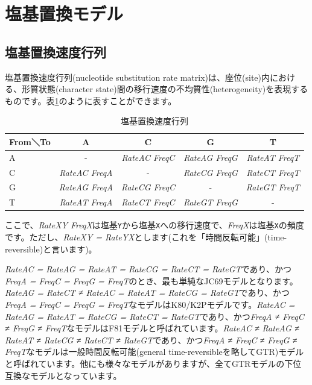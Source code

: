 \documentclass[titlepage,10pt,a4paper]{jsbook}
\begin{document}
\section{塩基置換モデル}

\subsection{塩基置換速度行列}\label{subsection:nucleotide_substitution_rate_matrix}

塩基置換速度行列(nucleotide substitution rate matrix)は、座位(site)内における、形質状態(character state)間の移行速度の不均質性(heterogeneity)を表現するものです。表\ref{table:nucleotide_substitution_rate_matrix}のように表すことができます。
\begin{table}[h]
\begin{center}
\footnotesize\setlength{\baselineskip}{0.9em}%
\begin{tabular}{l|cccc}
From＼To & A & C & G & T \\\hline
A & - & \textit{RateAC FreqC} & \textit{RateAG FreqG} & \textit{RateAT FreqT} \\
C & \textit{RateAC FreqA} & - & \textit{RateCG FreqG} & \textit{RateCT FreqT} \\
G & \textit{RateAG FreqA} & \textit{RateCG FreqC} & - & \textit{RateGT FreqT} \\
T & \textit{RateAT FreqA} & \textit{RateCT FreqC} & \textit{RateGT FreqG} & - \\
\end{tabular}
\end{center}
\caption{塩基置換速度行列}\label{table:nucleotide_substitution_rate_matrix}
\end{table}

ここで、\textit{RateXY FreqX}は塩基\texttt{Y}から塩基\texttt{X}への移行速度で、\textit{FreqX}は塩基\texttt{X}の頻度です。ただし、\textit{RateXY = RateYX}とします(これを「時間反転可能」(time-reversible)と言います)。

\textit{RateAC = RateAG = RateAT = RateCG = RateCT = RateGT}であり、かつ\textit{FreqA = FreqC = FreqG = FreqT}のとき、最も単純なJC69モデル\citep{Jukes1969}となります。\textit{RateAG = RateCT ≠ RateAC = RateAT = RateCG = RateGT}であり、かつ\textit{FreqA = FreqC = FreqG = FreqT}なモデルはK80/K2Pモデル\citep{Kimura1980}です。\textit{RateAC = RateAG = RateAT = RateCG = RateCT = RateGT}であり、かつ\textit{FreqA ≠ FreqC ≠ FreqG ≠ FreqT}なモデルはF81モデル\citep{Felsenstein1981}と呼ばれています。\textit{RateAC ≠ RateAG ≠ RateAT ≠ RateCG ≠ RateCT ≠ RateGT}であり、かつ\textit{FreqA ≠ FreqC ≠ FreqG ≠ FreqT}なモデル\citep{Tavare1986}は一般時間反転可能(general time-reversibleを略してGTR)モデルと呼ばれています\citep{Posada1998}。他にも様々なモデルがありますが、全てGTRモデルの下位互換なモデルとなっています。
\end{document}
